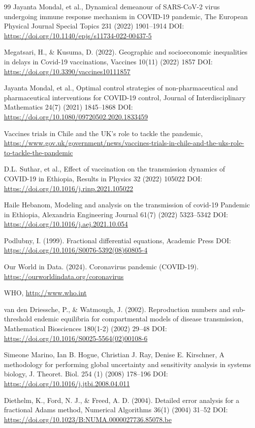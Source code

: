 \documentclass[10pt]{NSP1}
\begin{document}
\begin{thebibliography}{99}
Jayanta Mondal, et al., Dynamical demeanour of SARS-CoV-2 virus undergoing immune response mechanism in COVID-19 pandemic, The European Physical Journal Special Topics 231 (2022) 1901--1914 DOI: \url{https://doi.org/10.1140/epjs/s11734-022-00437-5}

Megatsari, H., \& Kusuma, D. (2022). Geographic and socioeconomic inequalities in delays in Covid-19 vaccinations, Vaccines 10(11) (2022) 1857 DOI: \url{https://doi.org/10.3390/vaccines10111857}

Jayanta Mondal, et al., Optimal control strategies of non-pharmaceutical and pharmaceutical interventions for COVID-19 control, Journal of Interdisciplinary Mathematics 24(7) (2021) 1845--1868 DOI: \url{https://doi.org/10.1080/09720502.2020.1833459}

Vaccines trials in Chile and the UK's role to tackle the pandemic, \url{https://www.gov.uk/government/news/vaccines-trials-in-chile-and-the-uks-role-to-tackle-the-pandemic}

D.L. Suthar, et al., Effect of vaccination on the transmission dynamics of COVID-19 in Ethiopia, Results in Physics 32 (2022) 105022 DOI: \url{https://doi.org/10.1016/j.rinp.2021.105022}

Haile Hebanom, Modeling and analysis on the transmission of covid-19 Pandemic in Ethiopia, Alexandria Engineering Journal 61(7) (2022) 5323--5342 DOI: \url{https://doi.org/10.1016/j.aej.2021.10.054}

Podlubny, I. (1999). Fractional differential equations, Academic Press DOI: \url{https://doi.org/10.1016/S0076-5392(08)60805-4}

Our World in Data. (2024). Coronavirus pandemic (COVID-19). \url{https://ourworldindata.org/coronavirus}

WHO, \url{http://www.who.int}

van den Driessche, P., \& Watmough, J. (2002). Reproduction numbers and sub-threshold endemic equilibria for compartmental models of disease transmission, Mathematical Biosciences 180(1-2) (2002) 29--48 DOI: \url{https://doi.org/10.1016/S0025-5564(02)00108-6}

Simeone Marino, Ian B. Hogue, Christian J. Ray, Denise E. Kirschner, A methodology for performing global uncertainty and sensitivity analysis in systems biology, J. Theoret. Biol. 254 (1) (2008) 178--196 DOI: \url{https://doi.org/10.1016/j.jtbi.2008.04.011}

Diethelm, K., Ford, N. J., \& Freed, A. D. (2004). Detailed error analysis for a fractional Adams method, Numerical Algorithms 36(1) (2004) 31--52 DOI: \url{https://doi.org/10.1023/B:NUMA.0000027736.85078.be}
\end{thebibliography}
\end{document}
